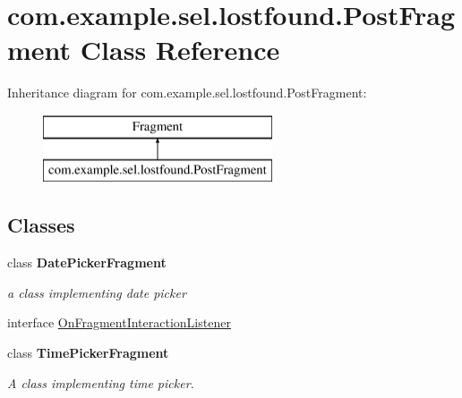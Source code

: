 \hypertarget{classcom_1_1example_1_1sel_1_1lostfound_1_1PostFragment}{\section{com.\-example.\-sel.\-lostfound.\-Post\-Fragment Class Reference}
\label{classcom_1_1example_1_1sel_1_1lostfound_1_1PostFragment}
}
Inheritance diagram for com.\-example.\-sel.\-lostfound.\-Post\-Fragment\-:\begin{figure}[H]
\begin{center}
\leavevmode
\includegraphics[height=2.000000cm]{classcom_1_1example_1_1sel_1_1lostfound_1_1PostFragment}
\end{center}
\end{figure}
\subsection*{Classes}
\begin{DoxyCompactItemize}
\item 
class {\bfseries Date\-Picker\-Fragment}
\begin{DoxyCompactList}\small\item\em a class implementing date picker \end{DoxyCompactList}\item 
interface \hyperlink{interfacecom_1_1example_1_1sel_1_1lostfound_1_1PostFragment_1_1OnFragmentInteractionListener}{On\-Fragment\-Interaction\-Listener}
\item 
class {\bfseries Time\-Picker\-Fragment}
\begin{DoxyCompactList}\small\item\em A class implementing time picker. \end{DoxyCompactList}\end{DoxyCompactItemize}
